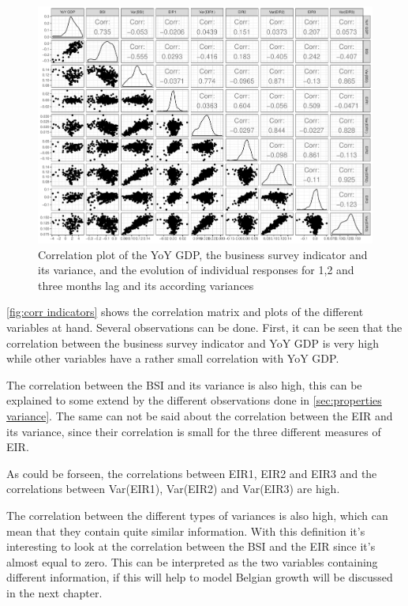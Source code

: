\documentclass[12pt,a4paper,oneside]{book}
\begin{document}
\begin{figure}[H]
    \centering
    \includegraphics[scale=0.5]{Graphs/corr_indicators.pdf}
    \caption{Correlation plot of the YoY GDP, the business survey indicator and its variance, and the evolution of individual responses for 1,2 and three months lag and its according variances}
    \label{fig:corr indicators}
\end{figure}

\autoref{fig:corr indicators} shows the correlation matrix and plots of the different variables at hand. 
Several observations can be done.
First, it can be seen that the correlation between the business survey indicator and YoY GDP is very high while other variables have a rather small correlation with YoY GDP.

The correlation between the BSI and its variance is also high, this can be explained to some extend by the different observations done in \autoref{sec:properties variance}.
The same can not be said about the correlation between the EIR and its variance, since their correlation is small for the three different measures of EIR.

As could be forseen, the correlations between EIR1, EIR2 and EIR3 and the correlations between Var(EIR1), Var(EIR2) and Var(EIR3) are high.

The correlation between the different types of variances is also high, which can mean that they contain quite similar information.
With this definition it's interesting to look at the correlation between the BSI and the EIR since it's almost equal to zero. This can be interpreted as the two variables containing different information, if this will help to model Belgian growth will be discussed in the next chapter.
\end{document}
